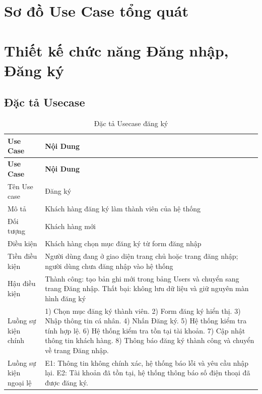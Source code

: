 \documentclass[../BTL.tex]{subfiles}
\begin{document}
\section{Sơ đồ Use Case tổng quát}

\section{Thiết kế chức năng Đăng nhập, Đăng ký}
\subsection{Đặc tả Usecase}
\begin{longtable}{|p{}|p{}|}
\caption{Đặc tả Usecase đăng ký}\label{tab:usecase-dang-ky}\\
\hline
\textbf{Use Case} & \textbf{Nội Dung} \\
\hline
\endfirsthead
\hline
\textbf{Use Case} & \textbf{Nội Dung} \\
\hline
\endhead
Tên Use case & Đăng ký \\
\hline
Mô tả & Khách hàng đăng ký làm thành viên của hệ thống \\
\hline
Đối tượng & Khách hàng mới \\
\hline
Điều kiện & Khách hàng chọn mục đăng ký từ form đăng nhập \\
\hline
Tiền điều kiện & Người dùng đang ở giao diện trang chủ hoặc trang đăng nhập; người dùng chưa đăng nhập vào hệ thống \\
\hline
Hậu điều kiện & Thành công: tạo bản ghi mới trong bảng Users và chuyển sang trang Đăng nhập. Thất bại: không lưu dữ liệu và giữ nguyên màn hình đăng ký \\
\hline
Luồng sự kiện chính & 1) Chọn mục đăng ký thành viên. 2) Form đăng ký hiển thị. 3) Nhập thông tin cá nhân. 4) Nhấn Đăng ký. 5) Hệ thống kiểm tra tính hợp lệ. 6) Hệ thống kiểm tra tồn tại tài khoản. 7) Cập nhật thông tin khách hàng. 8) Thông báo đăng ký thành công và chuyển về trang Đăng nhập. \\
\hline
Luồng sự kiện ngoại lệ & E1: Thông tin không chính xác, hệ thống báo lỗi và yêu cầu nhập lại. E2: Tài khoản đã tồn tại, hệ thống thông báo số điện thoại đã được đăng ký. \\
\hline
\end{longtable}
\end{document}
